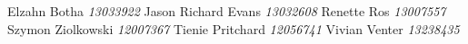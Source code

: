 \begin{flushright} \large
			Elzahn Botha 		\emph{13033922} \newline
			Jason Richard Evans	\emph{13032608} \newline
			Renette Ros			\emph{13007557} \newline
			Szymon Ziolkowski	\emph{12007367} \newline
			Tienie Pritchard 	\emph{12056741} \newline
			Vivian Venter 		\emph{13238435} \newline
\end{flushright}